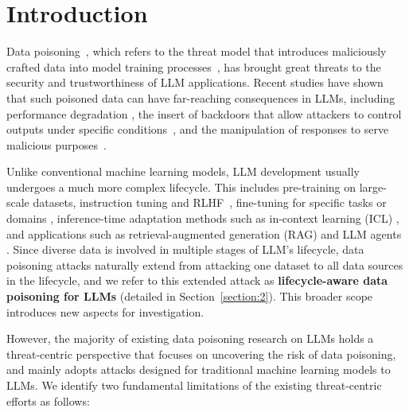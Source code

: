 \section{Introduction}
Data poisoning~\cite{zhao2023survey, zhang2023instruction, kojima2022large}, which refers to the threat model that introduces maliciously crafted data into model training processes~\cite{zhao2024survey, kandpal2023backdoor,hubinger2024sleeper}, has brought great threats to the security and trustworthiness of LLM applications. 
Recent studies have shown that such poisoned data can have far-reaching consequences in LLMs, including performance degradation \citep{he2024datapoisoningincontextlearning}, the insert of backdoors that allow attackers to control outputs under specific conditions~\citep{wan2023poisoning, kandpal2023backdoor, xiang2024badchain}, and the manipulation of responses to serve malicious purposes~\citep{bekbayev2023poison, rando2023universal, bowen2024data}.

Unlike conventional machine learning models, LLM development usually undergoes a much more complex lifecycle. This includes pre-training on large-scale datasets, instruction tuning and RLHF~\cite{ziegler2019fine,ouyang2022training}, fine-tuning for specific tasks or domains \citep{hu2021lora, liu2022few}, inference-time adaptation methods such as in-context learning (ICL) \citep{brown2020language}, and applications such as retrieval-augmented generation (RAG) \citep{lewis2020retrieval} and LLM agents \citep{wu2023autogen, gao2024agentscope}. Since diverse data is involved in multiple stages of LLM's lifecycle, data poisoning attacks naturally extend from attacking one dataset to all data sources in the lifecycle, and we refer to this extended attack as \textbf{lifecycle-aware data poisoning for LLMs} (detailed in Section~\ref{section:2}). 
This broader scope introduces new aspects for investigation.


However, the majority of existing data poisoning research on LLMs 
holds a threat-centric perspective that focuses on uncovering the risk of data poisoning, and mainly adopts attacks designed for traditional machine learning models to LLMs. 
We identify two fundamental limitations of the existing threat-centric efforts as follows:

